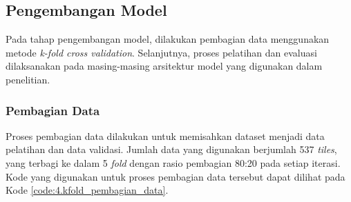 \subsection{Pengembangan Model} \label{IV.Pengembangan_Model}
Pada tahap pengembangan model, dilakukan pembagian data menggunakan metode \textit{k-fold cross validation}. Selanjutnya, proses pelatihan dan evaluasi dilaksanakan pada masing-masing arsitektur model yang digunakan dalam penelitian.

\subsubsection{Pembagian Data}
Proses pembagian data dilakukan untuk memisahkan dataset menjadi data pelatihan dan data validasi. Jumlah data yang digunakan berjumlah 537 \textit{tiles}, yang terbagi ke dalam 5 \textit{fold} dengan rasio pembagian 80:20 pada setiap iterasi. Kode yang digunakan untuk proses pembagian data tersebut dapat dilihat pada Kode \ref{code:4.kfold_pembagian_data}. \par
